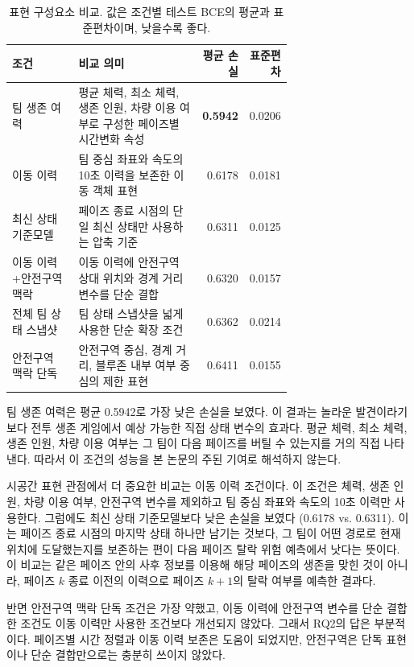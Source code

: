\begin{table}[t]
\centering
\caption{표현 구성요소 비교. 값은 조건별 테스트 BCE의 평균과 표준편차이며, 낮을수록 좋다.}
\label{tab:component-ranking}
\small
\setlength{\tabcolsep}{4pt}
\begin{tabular}{p{0.24\linewidth}p{0.45\linewidth}rr}
\toprule
조건 & 비교 의미 & 평균 손실 & 표준편차 \\
\midrule
팀 생존 여력
& 평균 체력, 최소 체력, 생존 인원, 차량 이용 여부로 구성한 페이즈별 시간변화 속성
& \textbf{0.5942} & 0.0206 \\
이동 이력
& 팀 중심 좌표와 속도의 10초 이력을 보존한 이동 객체 표현
& 0.6178 & 0.0181 \\
최신 상태 기준모델
& 페이즈 종료 시점의 단일 최신 상태만 사용하는 압축 기준
& 0.6311 & 0.0125 \\
이동 이력+안전구역 맥락
& 이동 이력에 안전구역 상대 위치와 경계 거리 변수를 단순 결합
& 0.6320 & 0.0157 \\
전체 팀 상태 스냅샷
& 팀 상태 스냅샷을 넓게 사용한 단순 확장 조건
& 0.6362 & 0.0214 \\
안전구역 맥락 단독
& 안전구역 중심, 경계 거리, 블루존 내부 여부 중심의 제한 표현
& 0.6411 & 0.0155 \\
\bottomrule
\end{tabular}
\end{table}

팀 생존 여력은 평균 0.5942로 가장 낮은 손실을 보였다. 이 결과는 놀라운 발견이라기보다
전투 생존 게임에서 예상 가능한 직접 상태 변수의 효과다. 평균 체력, 최소 체력,
생존 인원, 차량 이용 여부는 그 팀이 다음 페이즈를 버틸 수 있는지를 거의 직접
나타낸다. 따라서 이 조건의 성능을 본 논문의 주된 기여로 해석하지 않는다.

시공간 표현 관점에서 더 중요한 비교는 이동 이력 조건이다. 이 조건은 체력, 생존
인원, 차량 이용 여부, 안전구역 변수를 제외하고 팀 중심 좌표와
속도의 10초 이력만 사용한다. 그럼에도 최신 상태 기준모델보다 낮은 손실을 보였다
(0.6178 vs. 0.6311). 이는 페이즈 종료 시점의 마지막 상태 하나만 남기는 것보다,
그 팀이 어떤 경로로 현재 위치에 도달했는지를 보존하는 편이 다음 페이즈 탈락 위험
예측에서 낫다는 뜻이다. 이 비교는 같은 페이즈 안의 사후 정보를 이용해 해당
페이즈의 생존을 맞힌 것이 아니라, 페이즈 \(k\) 종료 이전의 이력으로 페이즈
\(k+1\)의 탈락 여부를 예측한 결과다.

반면 안전구역 맥락 단독 조건은 가장 약했고, 이동 이력에 안전구역 변수를 단순
결합한 조건도 이동 이력만 사용한 조건보다 개선되지 않았다. 그래서 RQ2의 답은
부분적이다. 페이즈별 시간 정렬과 이동 이력 보존은 도움이 되었지만, 안전구역은
단독 표현이나 단순 결합만으로는 충분히 쓰이지 않았다.

